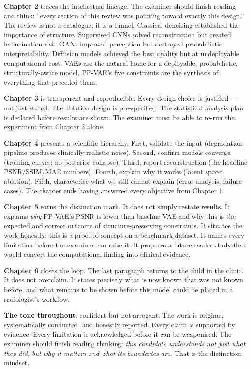 \documentclass[12pt, a4paper]{article}
\begin{document}
\bigskip

\noindent\textbf{Chapter 2} traces the intellectual lineage. The examiner
should finish reading and think: ``every section of this review was
pointing toward exactly this design.'' The review is not a catalogue;
it is a funnel. Classical denoising established the importance of structure.
Supervised CNNs solved reconstruction but created hallucination risk.
GANs improved perception but destroyed probabilistic interpretability.
Diffusion models achieved the best quality but at undeployable computational
cost. VAEs are the natural home for a deployable, probabilistic,
structurally-aware model. PP-VAE's five constraints are the synthesis
of everything that preceded them.

\bigskip

\noindent\textbf{Chapter 3} is transparent and reproducible. Every design
choice is justified — not just stated. The ablation design is pre-specified.
The statistical analysis plan is declared before results are shown.
The examiner must be able to re-run the experiment from Chapter 3 alone.

\bigskip

\noindent\textbf{Chapter 4} presents a scientific hierarchy. First, validate
the input (degradation pipeline produces clinically realistic noise).
Second, confirm models converge (training curves; no posterior collapse).
Third, report reconstruction (the headline PSNR/SSIM/MAE numbers).
Fourth, explain why it works (latent space; ablation). Fifth, characterise
what we still cannot explain (error analysis; failure cases). The chapter
ends having answered every objective from Chapter 1.

\bigskip

\noindent\textbf{Chapter 5} earns the distinction mark. It does not
simply restate results. It explains \textit{why} PP-VAE's PSNR is lower
than baseline VAE and why this is the expected and correct outcome of
structure-preserving constraints. It situates the work honestly: this is
a proof-of-concept on a benchmark dataset. It names every limitation before
the examiner can raise it. It proposes a future reader study that would
convert the computational finding into clinical evidence.

\bigskip

\noindent\textbf{Chapter 6} closes the loop. The last paragraph returns to
the child in the clinic. It does not overclaim. It states precisely what
is now known that was not known before, and what remains to be shown before
this model could be placed in a radiologist's workflow.

\bigskip

\noindent\textbf{The tone throughout}: confident but not arrogant. The work
is original, systematically conducted, and honestly reported. Every claim
is supported by evidence. Every limitation is acknowledged before
it can be weaponised. The examiner should finish reading thinking:
\textit{this candidate understands not just what they did, but why it
matters and what its boundaries are.} That is the distinction mindset.
\end{document}
